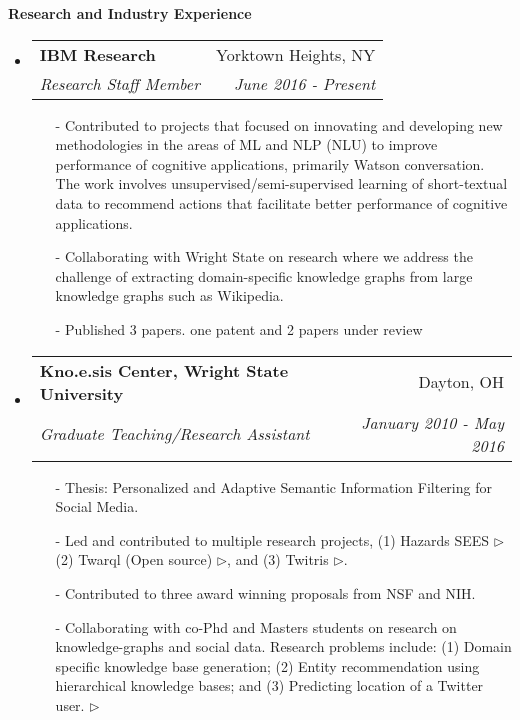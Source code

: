 \documentclass[letterpaper,9pt]{article}
\makeatletter
\newcommand{\resheading}[1]{{\large \colorbox{mygrey}{\begin{minipage}{\textwidth}{\textbf{#1 \vphantom{p\^{E}}}}\end{minipage}}}}
\newcommand{\ressubheading}[4]{
\begin{tabular*}{7.0in}{l@{\extracolsep{\fill}}r}
		\textbf{#1} & #2 \\
		\textit{#3} & \textit{#4} \\
\end{tabular*}\vspace{-6pt}}
\makeatother
\begin{document}
\resheading{Research and Industry Experience}
\begin{itemize}
\item
	\ressubheading{IBM Research}{Yorktown Heights, NY}{Research Staff Member}{June 2016 - Present}

\begin{itemize}

\item[-] Contributed to projects that focused on innovating and developing new methodologies in the areas of ML and NLP (NLU) to improve performance of cognitive applications, primarily Watson conversation. The work involves unsupervised/semi-supervised learning of short-textual data to recommend actions that facilitate better performance of cognitive applications. 

\item[-] \justify Collaborating with Wright State on research where we address the challenge of extracting domain-specific knowledge graphs from large knowledge graphs such as Wikipedia. 

\item[-] \justify Published 3 papers. one patent and 2 papers under review
\end{itemize}


\item
	\ressubheading{Kno.e.sis Center, Wright State University}{Dayton, OH}{Graduate Teaching/Research Assistant}{January 2010 - May 2016}

\begin{itemize}

\item[-] Thesis: Personalized and Adaptive Semantic Information Filtering for Social Media. 
	
\item[-] Led and contributed to multiple research projects, (1) Hazards SEES \href{http://wiki.knoesis.org/index.php/Social_and_Physical_Sensing_
Enabled_Decision_Support}{$\triangleright$} (2) Twarql (Open source) \href{http://wiki.knoesis.org/index.php/Twarql}{$\triangleright$}, and (3) Twitris \href{http://twitris.knoesis.org}{$\triangleright$}. 

\item[-] \justify Contributed to three award winning proposals from NSF and NIH.

\item[-] \justify Collaborating with co-Phd and Masters students on research on  knowledge-graphs and social data. Research problems include: (1) Domain specific knowledge base generation; (2) Entity recommendation using hierarchical knowledge bases; and (3) Predicting location of a Twitter user.  \href{http://knoesis.org/library/resource.php?id=2039}{$\triangleright$}  


\end{itemize}
\end{itemize}
\end{document}
